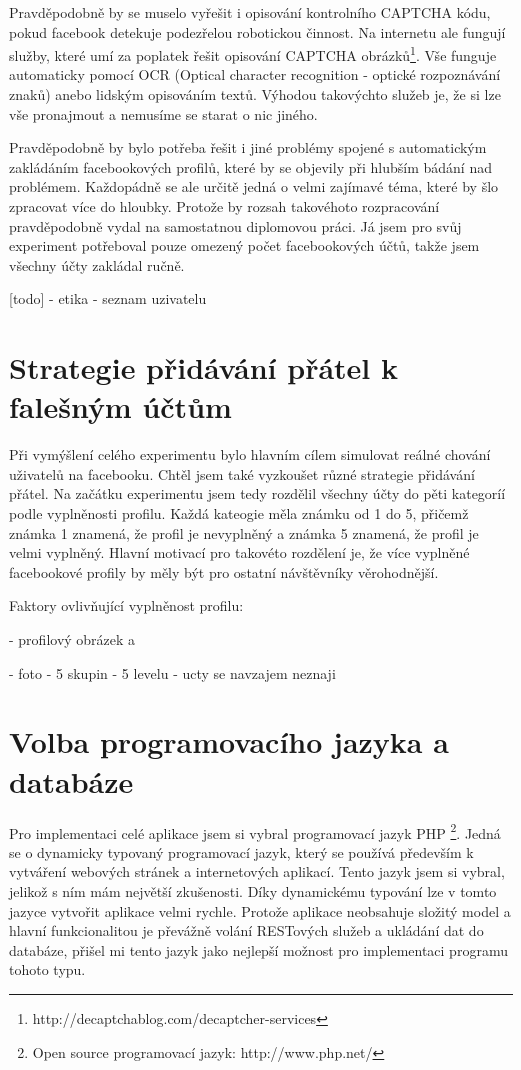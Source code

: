 \documentclass[thesis=M,czech]{FITthesis}[2013/05/10]
\begin{document}
Pravděpodobně by se muselo vyřešit i opisování kontrolního CAPTCHA kódu, pokud facebook detekuje podezřelou robotickou činnost. Na internetu ale fungují služby, které umí za poplatek řešit opisování CAPTCHA obrázků\footnote{http://decaptchablog.com/decaptcher-services}. Vše funguje automaticky pomocí OCR (Optical character recognition - optické rozpoznávání znaků) anebo lidským opisováním textů. Výhodou takovýchto služeb je, že si lze vše pronajmout a nemusíme se starat o nic jiného.

Pravděpodobně by bylo potřeba řešit i jiné problémy spojené s automatickým zakládáním facebookových profilů, které by se objevily při hlubším bádání nad problémem. Každopádně se ale určitě jedná o velmi zajímavé téma, které by šlo zpracovat více do hloubky. Protože by rozsah takovéhoto rozpracování pravděpodobně vydal na samostatnou diplomovou práci. Já jsem pro svůj experiment potřeboval pouze omezený počet facebookových účtů, takže jsem všechny účty zakládal ručně.

[todo]
- etika
- seznam uzivatelu

\section{Strategie přidávání přátel k falešným účtům}

Při vymýšlení celého experimentu bylo hlavním cílem simulovat reálné chování uživatelů na facebooku. Chtěl jsem také vyzkoušet různé strategie přidávání přátel. Na začátku experimentu jsem tedy rozdělil všechny účty do pěti kategoríí podle vyplněnosti profilu. Každá kateogie měla známku od 1 do 5, přičemž známka 1 znamená, že profil je nevyplněný a známka 5 znamená, že profil je velmi vyplněný. Hlavní motivací pro takovéto rozdělení je, že více vyplněné facebookové profily by měly být pro ostatní návštěvníky věrohodnější.

Faktory ovlivňující vyplněnost profilu:

- profilový obrázek a  

- foto
- 5 skupin
- 5 levelu
- ucty se navzajem neznaji

\section{Volba programovacího jazyka a databáze}

Pro implementaci celé aplikace jsem si vybral programovací jazyk 
PHP \footnote{Open source programovací jazyk: http://www.php.net/}. 
Jedná se o dynamicky typovaný 
programovací jazyk, který se používá především k vytváření webových 
stránek a internetových aplikací. Tento jazyk jsem si vybral, jelikož 
s ním mám největší zkušenosti. Díky dynamickému typování lze v tomto 
jazyce vytvořit aplikace velmi rychle. Protože aplikace neobsahuje 
složitý model a hlavní funkcionalitou je převážně volání RESTových 
služeb a ukládání dat do databáze, přišel mi tento jazyk jako nejlepší 
možnost pro implementaci programu tohoto typu.
\end{document}
